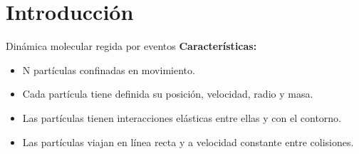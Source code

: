\section{Introducción}\label{sec:introduccion}

\begin{frame}{Dinámica molecular regida por eventos}
    \textbf{Características:}
    \begin{itemize}
        \item N partículas confinadas en movimiento.
        \item Cada partícula tiene definida su posición, velocidad, radio y masa.
        \item Las partículas tienen interacciones elásticas entre ellas y con el contorno.
        \item Las partículas viajan en línea recta y a velocidad constante entre colisiones.
    \end{itemize}
\end{frame}

